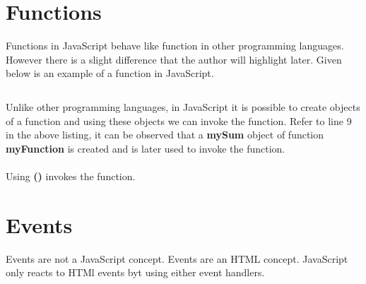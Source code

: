 \documentclass[twoside,12pt]{report}  %
\begin{document}
	
	\chapter{Functions}
	
	\noindent Functions in JavaScript behave like function in other programming languages. However there is a slight difference that the author will highlight later. Given below is an example of a function in JavaScript.
	
	\begin{listing}[H]
		\inputminted[linenos, autogobble, bgcolor=myjsbackground]{JavaScript}{../codes/js_functions.js}
	\end{listing}
	
	\noindent Unlike other programming languages, in JavaScript it is possible to create objects of a function and using these objects we can invoke the function. Refer to line 9 in the above listing, it can be observed that a \textbf{mySum} object of function \textbf{myFunction} is created and is later used to invoke the function.
	\\
	\\
	Using \textbf{()} invokes the function.
	
	
	
	\chapter{Events}
	
	\noindent Events are not a JavaScript concept. Events are an HTML concept. JavaScript only reacts to HTMl events byt using either event handlers.
	
	
	
	
\end{document}
